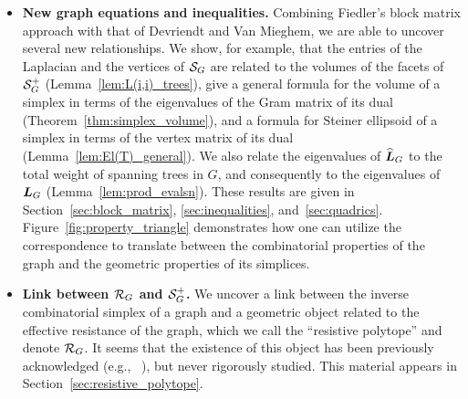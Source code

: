\begin{itemize}
	\item {\bf New graph equations and inequalities.} 	Combining Fiedler's block matrix approach with that of Devriendt and Van Mieghem, we are able to uncover several new relationships. 
	We show, for  example,  that the entries of the Laplacian and the  vertices  of $\mathcal{S}_G$ are related to the volumes of the facets of $\mathcal{S}_G^+$ (Lemma~\ref{lem:L(i,i)_trees}), give a general formula for the volume of a simplex in terms of the eigenvalues of the Gram matrix of its dual  (Theorem~\ref{thm:simplex_volume}), and a formula for Steiner ellipsoid of a simplex in terms of the vertex matrix of its dual (Lemma~\ref{lem:El(T)_general}). 
	We also relate  the eigenvalues of $\widehat{\vb*{L}}_G$  to the total weight of spanning trees in $G$, and  consequently  to the eigenvalues of $\vb*{L}_G$ (Lemma~\ref{lem:prod_evalsn}). 
	These results are given  in  Section~\ref{sec:block_matrix}, \ref{sec:inequalities}, and~\ref{sec:quadrics}.  
	Figure~\ref{fig:property_triangle}  demonstrates how one can utilize the correspondence to translate between the combinatorial properties of the graph  and  the geometric properties of its  simplices. 
	 
	\item {\bf Link between $\mathcal{R}_G$ and $\mathcal{S}_G^+$.} We uncover a link between the inverse combinatorial simplex of a graph and a geometric  object related to the effective resistance of the graph, which we call the ``resistive polytope'' and denote $\mathcal{R}_G$. It seems that the existence of this object has been previously acknowledged (e.g., ~\cite{shayanNotes}), but never rigorously studied. This material appears in Section~\ref{sec:resistive_polytope}. 
	

\end{itemize}

